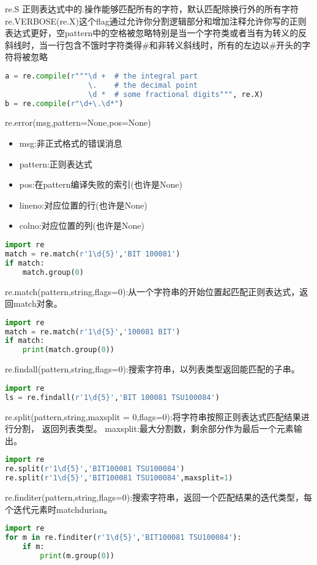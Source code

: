 re.S 正则表达式中的.操作能够匹配所有的字符，默认匹配除换行外的所有字符
re.VERBOSE(re.X)这个flag通过允许你分割逻辑部分和增加注释允许你写的正则表达式更好，空pattern中的空格被忽略特别是当一个字符类或者当有为转义的反斜线时，当一行包含不饿时字符类得\#和非转义斜线时，所有的左边以\#开头的字符将被忽略
\begin{lstlisting}[language=Python]
a = re.compile(r"""\d +  # the integral part
                   \.    # the decimal point
                   \d *  # some fractional digits""", re.X)
b = re.compile(r"\d+\.\d*")
\end{lstlisting}
re.error(msg,pattern=None,pos=None)
\begin{itemize}
        \item msg:非正式格式的错误消息
	\item pattern:正则表达式
	\item pos:在pattern编译失败的索引(也许是None)
	\item lineno:对应位置的行(也许是None)
	\item colno:对应位置的列(也许是None)
    \end{itemize}
\begin{lstlisting}[language=Python]
import re
match = re.match(r'1\d{5}','BIT 100081')
if match:
    match.group(0)
\end{lstlisting}
re.match(pattern,string,flags=0):从一个字符串的开始位置起匹配正则表达式，返回match对象。
\begin{lstlisting}[language=Python]
import re
match = re.match(r'1\d{5}','100081 BIT')
if match:
    print(match.group(0))
\end{lstlisting}
re.findall(pattern,string,flags=0):搜索字符串，以列表类型返回能匹配的子串。
\begin{lstlisting}[language=Python]
import re
ls = re.findall(r'1\d{5}','BIT 100081 TSU100084')
\end{lstlisting}
re.split(pattern,string,maxsplit = 0,flags=0):将字符串按照正则表达式匹配结果进行分割，
返回列表类型。\newline
maxsplit:最大分割数，剩余部分作为最后一个元素输出。\newline
\begin{lstlisting}[language=Python]
import re
re.split(r'1\d{5}','BIT100081 TSU100084')
re.split(r'1\d{5}','BIT100081 TSU100084',maxsplit=1)
\end{lstlisting}
re.finditer(pattern,string,flags=0):搜索字符串，返回一个匹配结果的迭代类型，每个迭代元素时matchdurian。
\begin{lstlisting}[language=Python]
import re
for m in re.finditer(r'1\d{5}','BIT100081 TSU100084'):
    if m:
        print(m.group(0))
\end{lstlisting}
